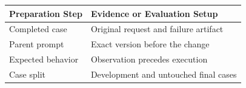 \begin{tabular}{@{}P{4.0cm}P{8.5cm}@{}}
\toprule
\textbf{Preparation Step} & \textbf{Evidence or Evaluation Setup} \\
\midrule
Completed case & Original request and failure artifact \\
Parent prompt & Exact version before the change \\
Expected behavior & Observation precedes execution \\
Case split & Development and untouched final cases \\
\bottomrule
\end{tabular}
